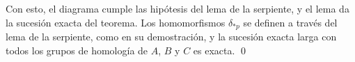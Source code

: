 \documentclass[11pt]{article}
\begin{document}
\medskip
Con esto, el diagrama cumple las hipótesis del lema de la serpiente, y el lema da la sucesión exacta del teorema. Los homomorfismos $\delta_{*p}$ se definen a través del lema de la serpiente, como en su demostración, y la sucesión exacta larga con todos los grupos de homología de $A$, $B$ y $C$ es exacta. \qed

\begin{erratas}
\end{erratas}
\end{document}
